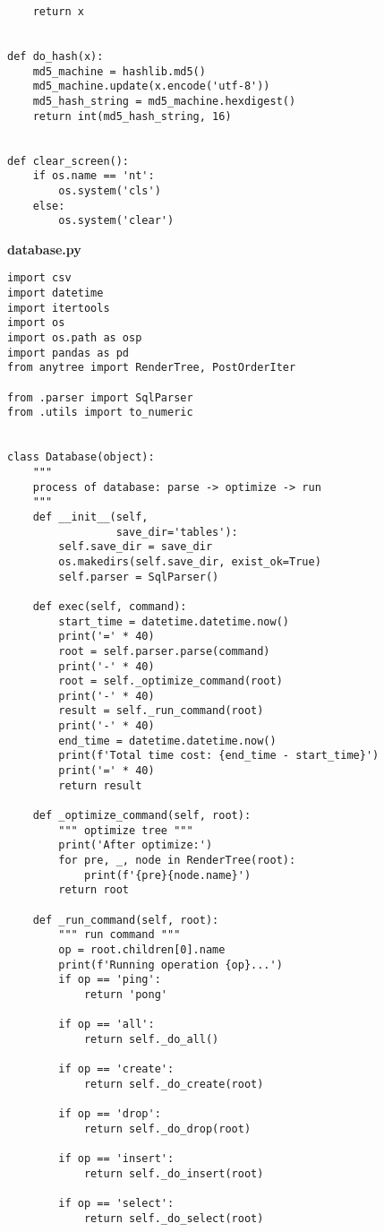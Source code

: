 \begin{appendix}
\begin{lstlisting}
    return x
        

def do_hash(x):
    md5_machine = hashlib.md5()
    md5_machine.update(x.encode('utf-8'))
    md5_hash_string = md5_machine.hexdigest()
    return int(md5_hash_string, 16)


def clear_screen():
    if os.name == 'nt':
        os.system('cls')
    else:
        os.system('clear')
\end{lstlisting}

\textbf{database.py}

\begin{lstlisting}
import csv
import datetime
import itertools
import os
import os.path as osp
import pandas as pd
from anytree import RenderTree, PostOrderIter

from .parser import SqlParser
from .utils import to_numeric


class Database(object):
    """
    process of database: parse -> optimize -> run
    """
    def __init__(self, 
                 save_dir='tables'):
        self.save_dir = save_dir
        os.makedirs(self.save_dir, exist_ok=True)
        self.parser = SqlParser()

    def exec(self, command):
        start_time = datetime.datetime.now()
        print('=' * 40)
        root = self.parser.parse(command)
        print('-' * 40)
        root = self._optimize_command(root)
        print('-' * 40)
        result = self._run_command(root)
        print('-' * 40)
        end_time = datetime.datetime.now()
        print(f'Total time cost: {end_time - start_time}')
        print('=' * 40)
        return result

    def _optimize_command(self, root):
        """ optimize tree """
        print('After optimize:')
        for pre, _, node in RenderTree(root):
            print(f'{pre}{node.name}')
        return root
    
    def _run_command(self, root):
        """ run command """
        op = root.children[0].name
        print(f'Running operation {op}...')
        if op == 'ping':
            return 'pong'
        
        if op == 'all':
            return self._do_all()

        if op == 'create':
            return self._do_create(root)

        if op == 'drop':
            return self._do_drop(root)

        if op == 'insert':
            return self._do_insert(root)

        if op == 'select':
            return self._do_select(root)
            

\end{lstlisting}
\end{appendix}
